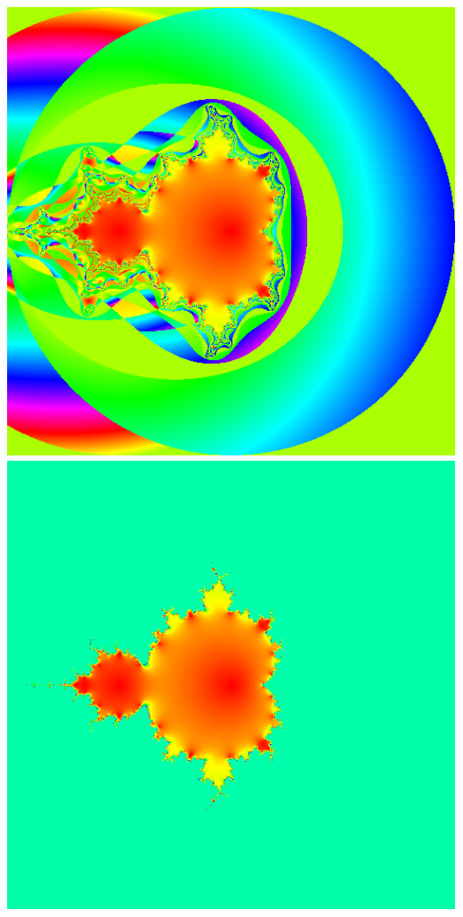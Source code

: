 \documentclass[../r.tex]{subfiles}
\begin{document}
\includegraphics[scale=0.15]{../TAing/mandel/7.png}
\includegraphics[scale=0.15]{../TAing/mandel/8.png}
\end{document}
